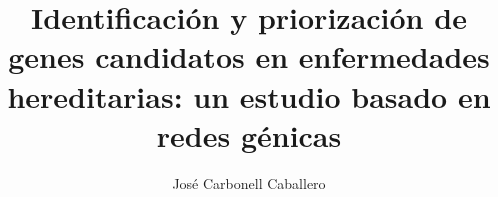 \documentclass[10pt,a4paper]{article}
\author{José Carbonell Caballero}
\title{Identificación y priorización de genes candidatos en enfermedades hereditarias: un estudio basado en redes génicas}
\begin{document}
\maketitle

\pagebreak







\end{document}
